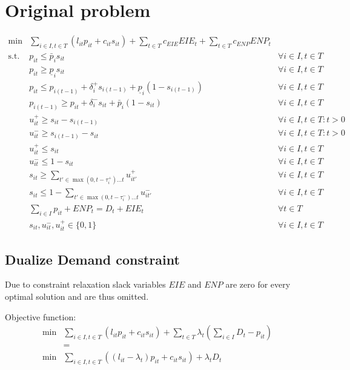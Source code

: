 \documentclass[12pt, a4paper]{article}
\begin{document}
  \section*{Original problem}

  \begin{align}
  \min & \sum_{i\in I, t\in T} \left ( l_{it} p_{it} + c_{it} s_{it} \right ) + \sum_{t\in T} c_{EIE} EIE_t + \sum_{t\in T} c_{ENP} ENP_t \\
  \text{s.t.~} & p_{it} \le \bar{p}_i s_{it} & \forall i\in I, t\in T \label{cons:orig-first}\\ 
       & p_{it} \ge \underline{p}_i s_{it} & \forall i\in I, t\in T\\
       & p_{it} \le p_{i(t-1)} + \delta^+_{i} s_{i(t-1)}  + \underline{p}_i (1 - s_{i(t-1)}) & \forall i\in I, t \in T\\
       & p_{i(t-1)} \ge p_{it} + \delta^-_{i} s_{it}  + \bar{p}_i (1 - s_{it}) & \forall i\in I, t \in T\\
       & u^+_{it} \ge s_{it} - s_{i(t-1)} & \forall i\in I, t\in T : t > 0\\
       & u^-_{it} \ge s_{i(t-1)} - s_{it} & \forall i\in I, t\in T : t > 0\\
       & u^+_{it} \le s_{it} & \forall i\in I, t\in T\\
       & u^-_{it} \le 1 - s_{it} & \forall i\in I, t\in T\\
       & s_{it} \ge \sum_{t'\in \max(0, t-\tau^+_i) \ldots t} u^+_{it'} & \forall i\in I, t\in T\\
       & s_{it} \le 1 - \sum_{t'\in \max(0, t-\tau^-_i) \ldots t} u^-_{it'} & \forall i\in I, t\in T \label{cons:orig-min-down}\\
       & \sum_{i\in I} p_{it} + ENP_{t} = D_t + EIE_t & \forall t\in T \quad \\
       & s_{it}, u^-_{it}, u^+_{it} \in \{0, 1\}  & \forall i\in I, t\in T \label{cons:orig-bin-vars}
\end{align}


\subsection*{Dualize Demand constraint}
Due to constraint relaxation slack variables $EIE$ and $ENP$ are zero for every optimal solution and are thus omitted.


Objective function:
\begin{align*}
  \min &\sum_{i\in I, t\in T} \left ( l_{it} p_{it} + c_{it} s_{it} \right ) + \sum_{t\in T} \lambda_t (\sum_{i\in I} D_t - p_{it}) \\
   &=\\
   \min &\sum_{i\in I, t\in T} \left ( (l_{it} -\lambda_t) p_{it} + c_{it} s_{it} \right ) + \lambda_t D_t
\end{align*}
\end{document}
